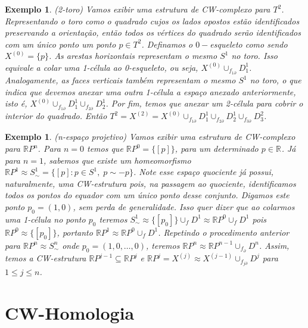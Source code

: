 \documentclass[12pt]{book}
\newtheorem{exemplo}[teorema]{Exemplo}
\newcommand{\celula}[2]{D^{#1}_{#2}}
\newcommand{\classe}[1]{[#1]}
\newcommand{\real}[1]{\mathbb{R}^{#1}}
\newcommand{\realprojetivo}[1]{\mathbb{R}P^{#1}}
\newcommand{\skeleton}[1]{X^{(#1)}}
\begin{document}
	\begin{exemplo}
		(2-toro) Vamos exibir uma estrutura de CW-complexo para $T^{2}$. Representando o toro como o quadrado cujos os lados opostos estão identificados preservando a orientação, então todos os vértices do quadrado serão identificados com um único ponto um ponto $p \in T^{2}$. Definamos o $0-$esqueleto como sendo $\skeleton{0} = \{p\}$. As arestas horizontais representam o mesmo $S^{1}$ no toro. Isso equivale a colar uma 1-célula ao 0-esqueleto, ou seja, $\skeleton{0}\cup_{f_{1\partial}}\celula{1}{1}$. Analogamente, as faces verticais também representam o mesmo $S^{1}$ no toro, o que indica que devemos anexar uma outra 1-célula a espaço anexado anteriormente, isto é, $\skeleton{0}\cup_{f_{1\partial}}\celula{1}{1}\cup_{f_{2\partial}}\celula{1}{2}$. Por fim, temos que anexar um 2-célula para cobrir o interior do quadrado. Então $T^{2} =\skeleton{2} = \skeleton{0}\cup_{f_{1\partial}}\celula{1}{1}\cup_{f_{2\partial}}\celula{1}{2}\cup_{f_{3\partial}}\celula{2}{3}$.
	\end{exemplo}
	
	\begin{exemplo}
		(n-espaço projetivo) Vamos exibir uma estrutura de CW-complexo para $\realprojetivo{n}$. Para $n=0$ temos que $\realprojetivo{0} = \{\classe{p}\}$, para um determinado $p \in \real{}$. Já para $n=1$, sabemos que existe um homeomorfismo $\realprojetivo{1} \approx S^{1}_{\sim} = \{\classe{p}: p \in S^{1},\; p \sim -p\}$. Note esse espaço quociente já possui, naturalmente, uma CW-estrutura pois, na passagem ao quociente, identificamos todos os pontos do equador com um único ponto desse conjunto. Digamos este ponto $p_{0} = (1,0)$, sem perda de generalidade. Isso quer dizer que ao colarmos uma 1-célula no ponto $p_{0}$ teremos $S^{1}_{\sim} \approx \{[p_{0}]\} \cup_{f}D^{1} \approx \realprojetivo{0}\cup_{f}D^{1} $ pois $\realprojetivo{0} \approx \{[p_{0}]\}$, portanto $ \realprojetivo{1} \approx \realprojetivo{0}\cup_{f}D^{1}$. Repetindo o procedimento anterior para $\realprojetivo{n} \approx S^{n}_{\sim} $ onde $p_{0} = (1,0,\dots, 0)$, teremos $\realprojetivo{n} \approx \realprojetivo{n-1} \cup_{f_{\partial}}D^{n}$. Assim, temos a CW-estrutura $\realprojetivo{j-1} \subseteq \realprojetivo{j}$ e $\realprojetivo{j} = \skeleton{j} \approx \skeleton{j-1}\cup_{f_{j\partial}}D^{j}$ para $1\leq j \leq n$.
	\end{exemplo}
	
	\section{CW-Homologia}\label{secao_cw_homologia}
	
\end{document}
